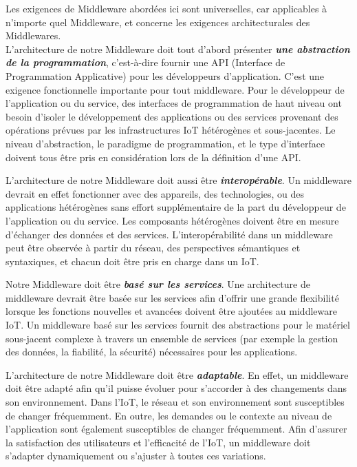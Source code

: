 Les exigences de Middleware abordées ici sont universelles, car applicables à n'importe quel Middleware, et concerne les exigences architecturales des Middlewares.
\\

L'architecture de notre Middleware doit tout d'abord présenter \textbf{\textit{une abstraction de la programmation}}, c'est-à-dire fournir une API (Interface de Programmation Applicative) pour les développeurs d'application. C'est une exigence fonctionnelle importante pour tout middleware\cite{IBM}. Pour le développeur de l'application ou du service, des interfaces de programmation de haut niveau ont besoin d'isoler le développement des applications ou des services provenant des opérations prévues par les infrastructures IoT hétérogènes et sous-jacentes. Le niveau d'abstraction, le paradigme de programmation, et le type d'interface doivent tous être pris en considération lors de la définition d'une API.

L'architecture de notre Middleware doit aussi être \textbf{\textit{interopérable}}. Un middleware devrait en effet fonctionner avec des appareils, des technologies, ou des applications hétérogènes sans effort supplémentaire de la part du développeur de l'application ou du service. Les composants hétérogènes doivent être en mesure d'échanger des données et des services. L'interopérabilité dans un middleware peut être observée à partir du réseau, des perspectives sémantiques et syntaxiques, et chacun doit être pris en charge dans un IoT.

Notre Middleware doit être \textbf{\textit{basé sur les services}}. Une architecture de middleware devrait être basée sur les services afin d’offrir une grande flexibilité lorsque les fonctions nouvelles et avancées doivent être ajoutées au middleware IoT. Un middleware basé sur les services fournit des abstractions pour le matériel sous-jacent complexe à travers un ensemble de services (par exemple la gestion des données, la fiabilité, la sécurité) nécessaires pour les applications.

L'architecture de notre Middleware doit être \textbf{\textit{adaptable}}. En effet, un middleware doit être adapté afin qu'il puisse évoluer pour s'accorder à des changements dans son environnement. Dans l'IoT, le réseau et son environnement sont susceptibles de changer fréquemment. En outre, les demandes ou le contexte au niveau de l'application sont également susceptibles de changer fréquemment. Afin d'assurer la satisfaction des utilisateurs et l'efficacité de l'IoT, un middleware doit s’adapter dynamiquement ou s'ajuster à toutes ces variations.

